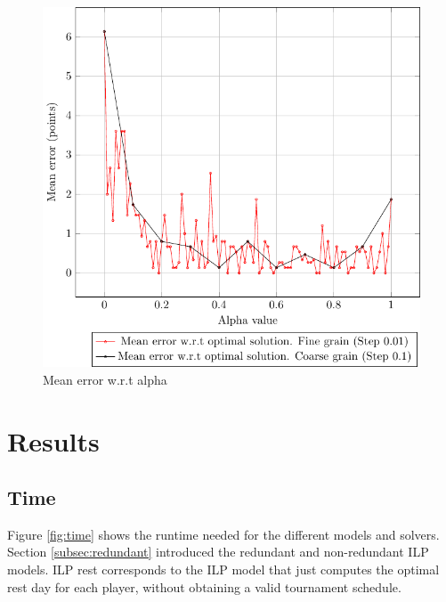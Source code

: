 \documentclass[a4paper, 10pt]{article}
\begin{document}
\begin{figure}[H]
    \centering
    \includegraphics[width=0.7\linewidth]{plots/error.pdf}
    \caption{Mean error w.r.t alpha}
    \label{fig:error}
\end{figure}

\clearpage

\section{Results}

\subsection{Time}

Figure \ref{fig:time} shows the runtime needed for the different models and solvers. Section \ref{subsec:redundant} introduced the redundant and non-redundant ILP models. ILP rest corresponds to the ILP model that just computes the optimal rest day for each player, without obtaining a valid tournament schedule. 
\end{document}
